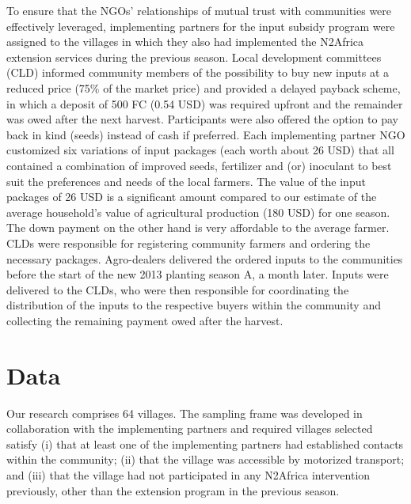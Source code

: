 To ensure that the NGOs’ relationships of mutual trust with communities were effectively leveraged, implementing partners for the input subsidy program were assigned to the villages in which they also had implemented the N2Africa extension services during the previous season. Local development committees (CLD) informed community members of the possibility to buy new inputs at a reduced price (75\% of the market price) and provided a delayed payback scheme, in which a deposit of 500 FC (0.54 USD) was required upfront and the remainder was owed after the next harvest. Participants were also offered the option to pay back in kind (seeds) instead of cash if preferred. Each implementing partner NGO customized six variations of input packages (each worth about 26 USD) that all contained a combination of improved seeds, fertilizer and (or) inoculant to best suit the preferences and needs of the local farmers. The value of the input packages of 26 USD is a significant amount compared to our estimate of the average household’s value of agricultural production (180 USD) for one season. The down payment on the other hand is very affordable to the average farmer. CLDs were responsible for registering community farmers and ordering the necessary packages. Agro-dealers delivered the ordered inputs to the communities before the start of the new 2013 planting season A, a month later. Inputs were delivered to the CLDs, who were then responsible for coordinating the distribution of the inputs to the respective buyers within the community and collecting the remaining payment owed after the harvest.

\section{Data}
Our research comprises 64 villages. The sampling frame was developed in collaboration with the implementing partners and required villages selected satisfy (i) that at least one of the implementing partners had established contacts within the community; (ii) that the village was accessible by motorized transport; and (iii) that the village had not participated in any N2Africa intervention previously, other than the extension program in the previous season.

